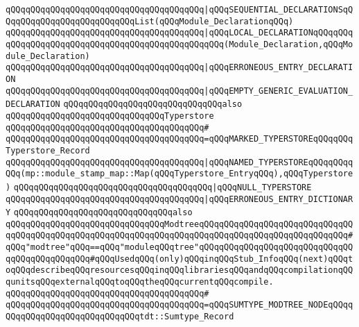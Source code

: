 \verb|qQQqqQQqqQQqqQQqqQQqqQQqqQQqqQQqqQQqqQQq|\verb#|qQQqSEQUENTIAL_DECLARATIONSqQQqqQQqqQQqqQQqqQQqqQQqqQQqList(qQQqModule_DeclarationqQQq)#\newline
\verb|qQQqqQQqqQQqqQQqqQQqqQQqqQQqqQQqqQQqqQQq|\verb#|qQQqLOCAL_DECLARATIONqQQqqQQqqQQqqQQqqQQqqQQqqQQqqQQqqQQqqQQqqQQqqQQqqQQq(Module_Declaration,qQQqModule_Declaration)#\newline
\verb|qQQqqQQqqQQqqQQqqQQqqQQqqQQqqQQqqQQqqQQq|\verb#|qQQqERRONEOUS_ENTRY_DECLARATION#\newline
\verb|qQQqqQQqqQQqqQQqqQQqqQQqqQQqqQQqqQQqqQQq|\verb#|qQQqEMPTY_GENERIC_EVALUATION_DECLARATION#\newline
\newline
\newline
\newline
\verb|qQQqqQQqqQQqqQQqqQQqqQQqqQQqqQQqalso|\newline
\verb|qQQqqQQqqQQqqQQqqQQqqQQqqQQqqQQqTyperstore|\newline
\verb|qQQqqQQqqQQqqQQqqQQqqQQqqQQqqQQqqQQqqQQq#|\newline
\verb|qQQqqQQqqQQqqQQqqQQqqQQqqQQqqQQqqQQqqQQq=qQQqMARKED_TYPERSTOREqQQqqQQqTyperstore_Record|\newline
\verb|qQQqqQQqqQQqqQQqqQQqqQQqqQQqqQQqqQQqqQQq|\verb#|qQQqNAMED_TYPERSTOREqQQqqQQqqQQq(mp::module_stamp_map::Map(qQQqTyperstore_EntryqQQq),qQQqTyperstore)#\newline
\verb|qQQqqQQqqQQqqQQqqQQqqQQqqQQqqQQqqQQqqQQq|\verb#|qQQqNULL_TYPERSTORE#\newline
\verb|qQQqqQQqqQQqqQQqqQQqqQQqqQQqqQQqqQQqqQQq|\verb#|qQQqERRONEOUS_ENTRY_DICTIONARY#\newline
\newline
\newline
\newline
\verb|qQQqqQQqqQQqqQQqqQQqqQQqqQQqqQQqalso|\newline
\verb|qQQqqQQqqQQqqQQqqQQqqQQqqQQqqQQqModtreeqQQqqQQqqQQqqQQqqQQqqQQqqQQqqQQqqQQqqQQqqQQqqQQqqQQqqQQqqQQqqQQqqQQqqQQqqQQqqQQqqQQqqQQqqQQqqQQqqQQq#qQQq"modtree"qQQq==qQQq"moduleqQQqtree"qQQqqQQqqQQqqQQqqQQqqQQqqQQqqQQqqQQqqQQqqQQqqQQq#qQQqUsedqQQq(only)qQQqinqQQqStub_InfoqQQq(next)qQQqtoqQQqdescribeqQQqresourcesqQQqinqQQqlibrariesqQQqandqQQqcompilationqQQqunitsqQQqexternalqQQqtoqQQqtheqQQqcurrentqQQqcompile.|\newline
\verb|qQQqqQQqqQQqqQQqqQQqqQQqqQQqqQQqqQQqqQQq#|\newline
\verb|qQQqqQQqqQQqqQQqqQQqqQQqqQQqqQQqqQQqqQQq=qQQqSUMTYPE_MODTREE_NODEqQQqqQQqqQQqqQQqqQQqqQQqqQQqqQQqtdt::Sumtype_Record|\newline
